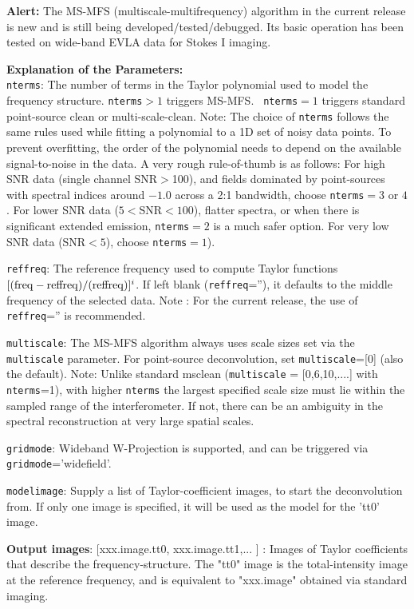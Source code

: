 {\bf Alert:} The MS-MFS (multiscale-multifrequency) algorithm in the
current release is new and is still being
developed/tested/debugged. Its basic operation has been tested on
wide-band EVLA data for Stokes I imaging.

{\bf Explanation of the Parameters:} \\
{\tt nterms}: The number of terms in the Taylor polynomial used to
model the frequency structure.  {\tt nterms}$>1$ triggers MS-MFS. {\tt
  nterms}$=1$ triggers standard point-source clean or
multi-scale-clean.  Note: The choice of {\tt nterms} follows the same
rules used while fitting a polynomial to a 1D set of noisy data
points. To prevent overfitting, the order of the polynomial needs to
depend on the available signal-to-noise in the data.  A very rough
rule-of-thumb is as follows: For high SNR data (single channel
SNR$>$100), and fields dominated by point-sources with spectral
indices around $-1.0$ across a 2:1 bandwidth, choose {\tt nterms}$=3$
or $4$. For lower SNR data ($5<$SNR$<100$), flatter spectra, or when
there is significant extended emission, {\tt nterms}$=2$ is a much
safer option. For very low SNR data (SNR$<5$), choose {\tt nterms}$=1$).



{\tt reffreq}: The reference frequency used to compute Taylor
functions $[ ({\rm freq} - {\rm reffreq})/({\rm reffreq}) ]^{i}$.  If
left blank ({\tt reffreq}=''), it defaults to the middle frequency of
the selected data.  Note : For the current release, the use of {\tt
  reffreq}='' is recommended.



{\tt multiscale}: The MS-MFS algorithm always uses scale sizes set via
the {\tt multiscale} parameter.  For point-source deconvolution, set
{\tt multiscale}=[0] (also the default).  Note: Unlike standard
msclean ({\tt multiscale} = [0,6,10,....] with {\tt nterms}=1), with
higher {\tt nterms} the largest specified scale size must lie within
the sampled range of the interferometer. If not, there can be an
ambiguity in the spectral reconstruction at very large spatial scales.

{\tt gridmode}: Wideband W-Projection is supported, and can be
triggered via {\tt gridmode}='widefield'.


{\tt modelimage}: Supply a list of Taylor-coefficient images, to start the deconvolution from.  
               If only one image is specified, it will be used as the model for the 'tt0' image. 
     

{\bf Output images}: [xxx.image.tt0,
               xxx.image.tt1,... ] : Images of Taylor coefficients
               that describe the frequency-structure.  The "tt0" image
               is the total-intensity image at the reference
               frequency, and is equivalent to "xxx.image" obtained
               via standard imaging.


